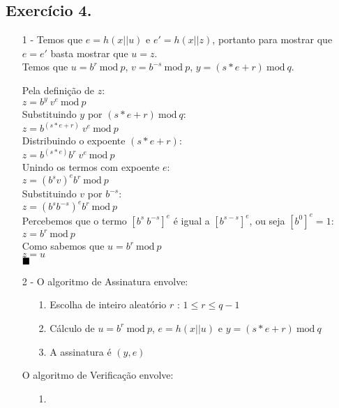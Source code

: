 \documentclass[12pt]{article}
\newcommand{\modd}{\ \text{mod}\ }
\newcommand*{\QED}{\hfill\ensuremath{\blacksquare}}
\begin{document}
	\subsection*{Exercício 4.}
		\begin{itemize}
			\item[1 -]
				Temos que $e = h(x||u)$ e $e' = h(x||z)$, portanto para mostrar
				que $e = e'$ basta mostrar que $u = z$.\\
				Temos que $u = b^r \modd p$, $v = b^{-s} \modd p$,
				$y = (s*e + r) \modd q$.
				\begin{center}
					Pela definição de $z$:\\
					$z = b^{y} \ v^e \modd p$\\
					Substituindo $y$ por $ (s*e + r) \modd q$:\\
					$z = b^{(s*e + r)} \ v^e \modd p$\\
					Distribuindo o expoente $(s*e + r)$:\\
					$z = b^{(s*e)} b^{r} \ v^e \modd p$\\
					Unindo os termos com expoente $e$:\\
					$z = (b^{s}v)^{e} b^{r} \modd p$\\
					Substituindo $v$ por $b^{-s}$:\\
					$z = (b^{s}b^{-s})^{e} b^{r} \modd p$\\
					Percebemos que o termo $[b^{s} \ b^{-s}]^{e}$ é igual
					a $[b^{s - s}]^{e}$, ou seja $[b^{0}]^{e} = 1$:\\
					$z = b^r \modd p$\\
					Como sabemos que $u = b^r\modd p$\\
					$z = u$\\
					$\QED$
				\end{center}	
			\newpage	
			\item[2 -]
				O algoritmo de Assinatura envolve:\\
					\begin{itemize}
						\item[1.]
							Escolha de inteiro aleatório $r$ : $1 \leq r \leq q-1$
						\item[2.]
							Cálculo de $u = b^r \modd p$, $e = h(x||u)$ e
							$y = (s*e + r) \modd q$
						 \item[3.]
						 	A assinatura é $(y, e)$		
					\end{itemize}
				O algoritmo de Verificação envolve:\\
					\begin{itemize}
						\item[1.]

\end{itemize}
\end{itemize}
\end{document}
